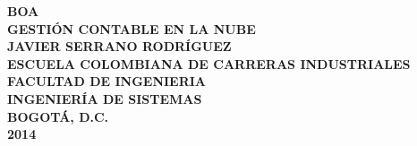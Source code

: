 \begin{titlepage}
\setlength{\parindent}{0pt} \setlength{\parskip}{0pt}

\begin{center}

\textbf{BOA\\GESTI\'ON CONTABLE EN LA NUBE\\[8cm] JAVIER SERRANO RODR\'IGUEZ}\\[9cm]



\textbf{ESCUELA COLOMBIANA DE CARRERAS INDUSTRIALES\\FACULTAD DE INGENIERIA\\INGENIER\'IA DE SISTEMAS\\BOGOT\'A, D.C.\\2014}
\end{center}
\end{titlepage}